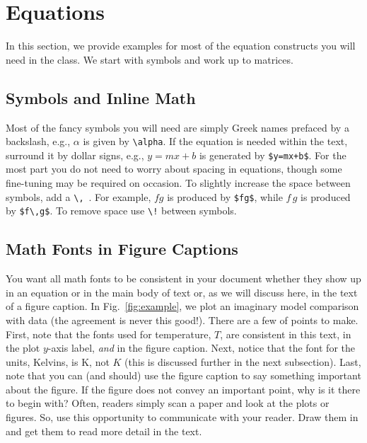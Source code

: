 \documentclass[12pt,letterpaper]{article}
\begin{document}
\section{Equations}

In this section, we provide examples for most of the equation constructs you will need in the class.  We start with symbols and work up to matrices.

\subsection{Symbols and Inline Math}

Most of the fancy symbols you will need are simply Greek names prefaced by a backslash, e.g., $\alpha$ is given by \verb=\alpha=.  If the equation is needed within the text, surround it by dollar signs, e.g., $y = mx + b$ is generated by \verb/$y=mx+b$/.  For the most part you do not need to worry about spacing in equations, though some fine-tuning may be required on occasion.  To slightly increase the space between symbols, add a \verb/\,/ \,. For example, $fg$ is produced by \verb/$fg$/, while $f\,g$ is produced by \verb/$f\,g$/.  To remove space use \verb/\!/ between symbols.

\subsection{Math Fonts in Figure Captions}

You want all math fonts to be consistent in your document whether they show up in an equation or in the main body of text or, as we will discuss here, in the text of a figure caption.  In Fig.~\ref{fig:example}, we plot an imaginary model comparison with data (the agreement is never this good!).  There are a few of points to make.  First, note that the fonts used for temperature, $T$, are consistent in this text, in the plot $y$-axis label, \emph{and} in the figure caption.  Next, notice that the font for the units, Kelvins, is K, not $K$ (this is discussed further in the next subsection). Last, note that you can (and should) use the figure caption to say something important about the figure.  If the figure does not convey an important point, why is it there to begin with?  Often, readers simply scan a paper and look at the plots or figures.  So, use this opportunity to communicate with your reader.  Draw them in and get them to read more detail in the text.
\end{document}
